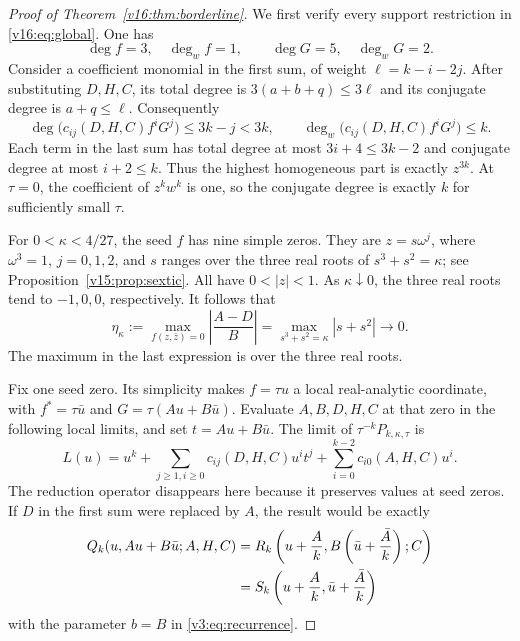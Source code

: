 \documentclass[UTF8,11pt]{ctexart}
\theoremstyle{definition}
\numberwithin{equation}{section}
\begin{document}
\begin{proof}[Proof of Theorem~\ref{v16:thm:borderline}]
We first verify every support restriction in
\eqref{v16:eq:global}. One has
\[
 \deg f=3,\quad \deg_wf=1,\qquad
 \deg G=5,\quad \deg_wG=2.
\]
Consider a coefficient monomial in the first sum, of weight
$\ell=k-i-2j$. After substituting $D,H,C$, its total degree is
$3(a+b+q)\le3\ell$ and its conjugate degree is
$a+q\le\ell$. Consequently
\begin{equation}\label{v16:eq:support}
 \deg\bigl(c_{ij}(D,H,C)f^iG^j\bigr)\le3k-j<3k,
 \qquad
 \deg_w\bigl(c_{ij}(D,H,C)f^iG^j\bigr)\le k.
\end{equation}
Each term in the last sum has total degree at most
$3i+4\le3k-2$ and conjugate degree at most $i+2\le k$.
Thus the highest homogeneous part is exactly $z^{3k}$.
At $\tau=0$, the coefficient of $z^kw^k$ is one, so the
conjugate degree is exactly $k$ for sufficiently small $\tau$.

For $0<\kappa<4/27$, the seed $f$ has nine simple zeros.
They are $z=s\omega^j$, where $\omega^3=1$, $j=0,1,2$, and
$s$ ranges over the three real roots of $s^3+s^2=\kappa$;
see Proposition~\ref{v15:prop:sextic}. All have $0<|z|<1$.
As $\kappa\downarrow0$, the three real roots tend to $-1,0,0$,
respectively. It follows that
\begin{equation}\label{v16:eq:defect}
 \eta_\kappa:=
 \max_{f(z,\bar z)=0}\left|\frac{A-D}{B}\right|
 =\max_{s^3+s^2=\kappa}|s+s^2|\longrightarrow0.
\end{equation}
The maximum in the last expression is over the three real roots.

Fix one seed zero. Its simplicity makes $f=\tau u$ a local
real-analytic coordinate, with $f^*=\tau\bar u$ and
$G=\tau(Au+B\bar u)$. Evaluate $A,B,D,H,C$ at that zero in
the following local limits, and set $t=Au+B\bar u$.
The limit of $\tau^{-k}P_{k,\kappa,\tau}$ is
\begin{equation}\label{v16:eq:local}
 L(u)=u^k+\sum_{j\ge1,i\ge0}c_{ij}(D,H,C)u^it^j
                +\sum_{i=0}^{k-2}c_{i0}(A,H,C)u^i.
\end{equation}
The reduction operator disappears here because it preserves
values at seed zeros. If $D$ in the first sum were replaced by
$A$, the result would be exactly
\begin{align}
 Q_k(u,Au+B\bar u;A,H,C)
 &=R_k\left(u+\frac Ak,
             B\left(\bar u+\frac{\bar A}{k}\right);C\right)
       \notag\\
 &=S_k\left(u+\frac Ak,\bar u+\frac{\bar A}{k}\right)
                                      \label{v16:eq:translated}
\end{align}
with the parameter $b=B$ in \eqref{v3:eq:recurrence}.


\end{proof}
\end{document}
